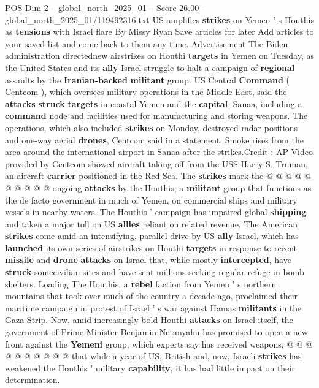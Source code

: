 \begin{textsample}{POS Dim 2 – global\_north\_2025\_01 – Score 26.00 – global\_north\_2025\_01/119492316.txt}  \label{ex:f2_pos_392}
US amplifies \textbf{strikes} on Yemen ' s Houthis as \textbf{tensions} with Israel flare By Missy Ryan Save articles for later Add articles to your saved list and come back to them any time.
Advertisement The Biden administration directednew airstrikes on Houthi \textbf{targets} in Yemen on Tuesday, as the United States and its \textbf{ally} Israel struggle to halt a campaign of \textbf{regional} assaults by the \textbf{Iranian-backed} \textbf{militant} group.
US Central \textbf{Command} ( Centcom ), which oversees military operations in the Middle East, said the \textbf{attacks} \textbf{struck} \textbf{targets} in coastal Yemen and the \textbf{capital}, Sanaa, including a \textbf{command} node and facilities used for manufacturing and storing weapons.
The operations, which also included \textbf{strikes} on Monday, destroyed radar positions and one-way aerial \textbf{drones}, Centcom said in a statement.
Smoke rises from the area around the international airport in Sanaa after the strikes.Credit : AP Video provided by Centcom showed aircraft taking off from the USS Harry S.
Truman, an aircraft \textbf{carrier} positioned in the Red Sea.
The \textbf{strikes} mark the @ @ @ @ @ @ @ @ @ @ ongoing \textbf{attacks} by the Houthis, a \textbf{militant} group that functions as the de facto government in much of Yemen, on commercial ships and military vessels in nearby waters.
The Houthis ' campaign has impaired global \textbf{shipping} and taken a major toll on US \textbf{allies} reliant on related revenue.
The American \textbf{strikes} come amid an intensifying, parallel drive by US \textbf{ally} Israel, which has \textbf{launched} its own series of airstrikes on Houthi \textbf{targets} in response to recent \textbf{missile} and \textbf{drone} \textbf{attacks} on Israel that, while mostly \textbf{intercepted}, have \textbf{struck} somecivilian sites and have sent millions seeking regular refuge in bomb shelters.
Loading The Houthis, a \textbf{rebel} faction from Yemen ' s northern mountains that took over much of the country a decade ago, proclaimed their maritime campaign in protest of Israel ' s war against Hamas \textbf{militants} in the Gaza Strip.
Now, amid increasingly bold Houthi \textbf{attacks} on Israel itself, the government of Prime Minister Benjamin Netanyahu has promised to open a new front against the \textbf{Yemeni} group, which experts say has received weapons, @ @ @ @ @ @ @ @ @ @ that while a year of US, British and, now, Israeli \textbf{strikes} has weakened the Houthis ' military \textbf{capability}, it has had little impact on their determination.

\end{textsample}
